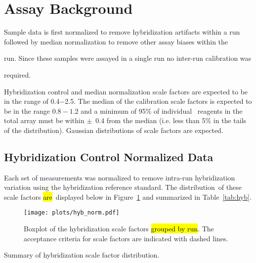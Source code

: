 \documentclass[11pt]{article}
\newif\ifcalibrated   %
\newif\ifincludeCalSop  %
\newif\ifuseLogScale  %
\newcommand{\Plural}{}
\newcommand{\IsAre}{\hl{are}}
\begin{document}
\section{Assay Background} \label{sec:background}
Sample data is first normalized to remove hybridization artifacts within a run
followed by median normalization to remove other assay biases within the 
\ifcalibrated
  run and finally calibrated to remove assay differences between runs. 
\else
  run. Since these samples were assayed in a single run no inter-run calibration was 
  \ifincludeCalSop
    required, though the calibration scale factors were examined to verify that
    the met the assay acceptance criteria.  
  \else
    required.
  \fi
\fi

Hybridization control and median normalization scale factors are expected to be
in the range of 0.4$-$2.5\ifuseLogScale ($\pm~1.32$ on log$_2$ scale)\fi. 
The median of the calibration scale factors is expected to be in the range
$0.8-1.2$ and a minimum of 95\% of individual \texttrademark~reagents in
the total array must be within $\pm$~0.4 from the median (i.e. less than 5\% in
the tails of the distribution). Gaussian distributions of scale factors are expected.


\subsection{Hybridization Control Normalized Data} \label{sec:hyb}
Each set of measurements was normalized to remove intra-run hybridization
variation using the hybridization reference standard. 
The distribution\Plural~of these scale factors \IsAre~displayed below in
Figure~\ref{fig:hyb_cdf} and summarized in Table~\ref{tab:hyb}.


\begin{figure}[H]
  \centering
  \texttt{[image: plots/hyb\_norm.pdf]}
  \caption{Boxplot of the hybridization scale factors \hl{grouped by run}. The
    acceptance criteria for scale factors are indicated with dashed lines.}
  \label{fig:hyb_cdf}
\end{figure}





\begin{table}[ht]
  \begin{center}
    
    \ifuseLogScale
      \caption{Summary of log$_2$ hybridization scale factor distribution\Plural.}
    \else 
      \caption{Summary of hybridization scale factor distribution\Plural.}
    \fi
    \label{tab:hyb}
  \end{center}
\end{table}
\end{document}

